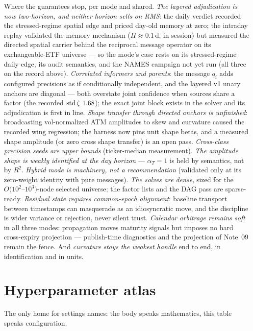 \documentclass[11pt]{article}
\begin{document}
Where the guarantees stop, per mode and shared.  \emph{The layered
adjudication is now two-horizon, and neither horizon sells on RMS}: the
daily verdict recorded the stressed-regime spatial edge and priced day-old
memory at zero; the intraday replay validated the memory mechanism
($H\approx0.1$\,d, in-session) but measured the directed spatial carrier
behind the reciprocal message operator on its exchangeable-ETF universe
--- so the mode's case rests on its stressed-regime daily edge, its audit
semantics, and the NAMES campaign not yet run (all three on the record
above).  \emph{Correlated informers and parents}: the message $q_i$ adds
configured precisions as if conditionally independent, and the layered
v1 unary anchors are diagonal --- both overstate joint confidence when
sources share a factor (the recorded
$\operatorname{std}\zeta\ 1.68$); the exact joint block exists in
the solver and its adjudication is first in line.  \emph{Shape transfer
through directed anchors is unfinished}: broadcasting vol-normalized ATM
amplitudes to skew and curvature caused the recorded wing regression;
the harness now pins unit shape betas, and a measured shape amplitude
(or zero cross shape transfer) is an open pass.  \emph{Cross-class
precision seeds are upper bounds} (ticker-median measurement).  \emph{The
amplitude shape is weakly identified at the day horizon} --- $\alpha_T=1$
is held by semantics, not by $R^2$.  \emph{Hybrid mode is machinery, not
a recommendation} (validated only at its zero-weight identity with pure
messages).  \emph{The solves are dense}, sized for the
$O(10^2$--$10^3)$-node selected universe; the factor lists and the DAG
pass are sparse-ready.  \emph{Residual state requires common-epoch
alignment}: baseline transport between timestamps can masquerade as an
idiosyncratic move, and the discipline is wider variance or rejection,
never silent trust.  \emph{Calendar arbitrage remains soft} in all three
modes: propagation moves maturity signals but imposes no hard
cross-expiry projection --- publish-time diagnostics and the projection
of Note~09 remain the fence.  And \emph{curvature stays the weakest
handle} end to end, in identification and in units.

\appendix
\section{Hyperparameter atlas}
\label{app:atlas}

The only home for settings names: the body speaks mathematics, this table
speaks configuration.
\end{document}
